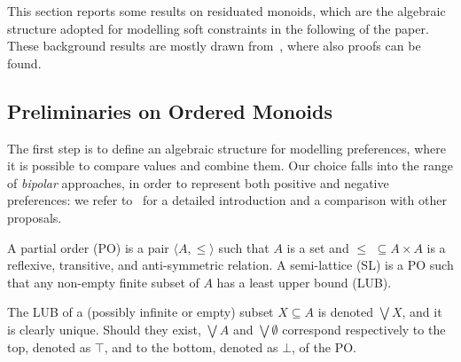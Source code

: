 \documentclass{llncs}
\newcommand{\comment}[1]{}
\begin{document}
This section reports some results on residuated monoids,
which are the algebraic structure adopted for modelling
soft constraints in the following of the paper.
These background results are mostly drawn from~\cite{jlamp17}, where also proofs can be found.


\subsection{Preliminaries on Ordered Monoids}\label{sec:lem}

The first step is to define an algebraic structure for modelling preferences,
where it is possible to compare values and combine them.
Our choice falls into the range of \emph{bipolar} approaches, in order 
to represent both positive and negative preferences: 
we refer to~\cite{ipl17} for a detailed introduction and 
a comparison with other proposals.

\begin{definition}[Orders]
	A partial order (PO) is a pair $\langle A, \leq \rangle$ such that
	$A$ is a set %
	and $\leq \,\,\subseteq A \times A$ is a reflexive, transitive, and
	anti-symmetric  relation.
	A semi-lattice (SL) is a PO
	such that any non-empty finite subset of $A$ has a least upper bound (LUB).
\end{definition}

The LUB of a (possibly infinite or empty) subset $X \subseteq A$ is denoted $\bigvee X$, and it is clearly unique.
Should  they exist, $\bigvee A$ and $\bigvee \emptyset$ correspond respectively to the top, denoted as 
$\top$, and to the bottom, denoted as $\bot$, of the PO.

\comment{\begin{definition}[Compact elements]
An element $a \in A$ is compact 
if whenever $a \leq \bigvee Y$ for some $Y \subseteq A$
there exists a finite subset
$X \subseteq Y$ such that $a \leq \bigvee X$.
%
\end{definition}

We let $A^C \subseteq A$ denote the set of compact elements of ${\mathbb C}$. }
\end{document}
